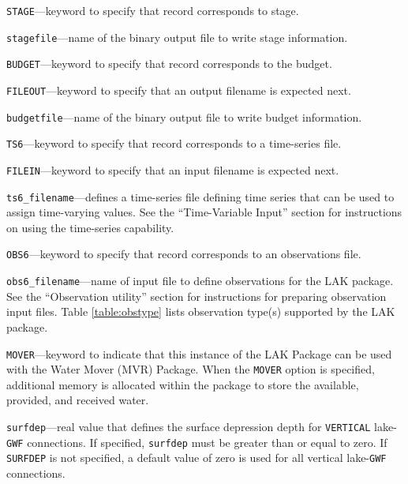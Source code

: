 \begin{description}
\item \texttt{STAGE}---keyword to specify that record corresponds to stage.

\item \texttt{stagefile}---name of the binary output file to write stage information.

\item \texttt{BUDGET}---keyword to specify that record corresponds to the budget.

\item \texttt{FILEOUT}---keyword to specify that an output filename is expected next.

\item \texttt{budgetfile}---name of the binary output file to write budget information.

\item \texttt{TS6}---keyword to specify that record corresponds to a time-series file.

\item \texttt{FILEIN}---keyword to specify that an input filename is expected next.

\item \texttt{ts6\_filename}---defines a time-series file defining time series that can be used to assign time-varying values. See the ``Time-Variable Input'' section for instructions on using the time-series capability.

\item \texttt{OBS6}---keyword to specify that record corresponds to an observations file.

\item \texttt{obs6\_filename}---name of input file to define observations for the LAK package. See the ``Observation utility'' section for instructions for preparing observation input files. Table \ref{table:obstype} lists observation type(s) supported by the LAK package.

\item \texttt{MOVER}---keyword to indicate that this instance of the LAK Package can be used with the Water Mover (MVR) Package.  When the \texttt{MOVER} option is specified, additional memory is allocated within the package to store the available, provided, and received water.

\item \texttt{surfdep}---real value that defines the surface depression depth for \texttt{VERTICAL} lake-\texttt{GWF} connections. If specified, \texttt{surfdep} must be greater than or equal to zero. If \texttt{SURFDEP} is not specified, a default value of zero is used for all vertical lake-\texttt{GWF} connections.


\end{description}
